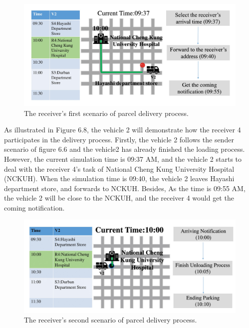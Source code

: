 \documentclass[12pt]{ksthesis}
\begin{document}
\begin{thesis}
{\begin{figure}[H]
\centering
\includegraphics[width=1.14\textwidth]{./Thesis_figures/F6-8_receiverScenario1.PNG}
\caption{\large The receiver's first scenario of parcel delivery process.}
\vspace{0.5cm}
\label{Fig:FirsrtReceiverScenario_deliveryProcess}
\end{figure}

As illustrated in Figure 6.8, the vehicle 2 will demonstrate how the receiver 4 participates in the delivery process. Firstly, the vehicle 2 follows the sender scenario of figure 6.6 and the vehicle2 has already finished the loading process.
However, the current simulation time is 09:37 AM, and the vehicle 2 starts to deal with the receiver 4’s task of National Cheng Kung University Hospital (NCKUH). When the simulation time is 09:40, the vehicle 2 leaves Hayashi department store, and forwards to NCKUH. Besides, As the time is 09:55 AM, the vehicle 2 will be close to the NCKUH, and the receiver 4 would get the coming notification.


\begin{figure}[H]
\centering
\includegraphics[width=1.14\textwidth]{./Thesis_figures/F6-9_receiverScenario2.PNG}
\caption{\large The receiver's second scenario of parcel delivery process.}
\vspace{0.5cm}
\label{Fig:Second_ReceiverScenario_DeliveryProcess}
\end{figure}

}
\end{thesis}
\end{document}
